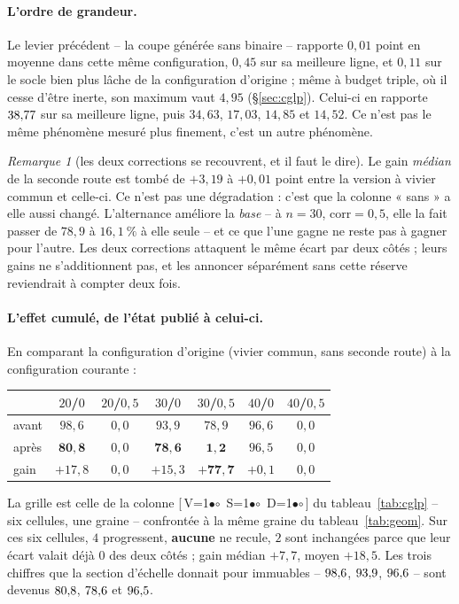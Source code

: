 \documentclass[11pt,a4paper]{article}
\theoremstyle{plain}
\theoremstyle{remark}
\newtheorem{remark}{Remarque}
\newcommand{\cfgm}[1]{\ifnum#1=1$\bullet$\else$\circ$\fi}
\newcommand{\conf}[3]{%
  \textsf{\footnotesize[\,V\cfgm{#1}\ S\cfgm{#2}\ D\cfgm{#3}\,]}}
\begin{document}
\paragraph{L'ordre de grandeur.} Le levier précédent -- la coupe générée
sans binaire -- rapporte $0{,}01$ point en moyenne dans cette même
configuration, $0{,}45$ sur sa meilleure ligne, et $0{,}11$ sur le socle
bien plus lâche de la configuration d'origine ; même à budget triple, où il
cesse d'être inerte, son maximum vaut $4{,}95$ (§\ref{sec:cglp}).
Celui-ci en rapporte $38{,}77{}$ sur sa meilleure ligne, puis $34{,}63$,
$17{,}03$, $14{,}85$ et $14{,}52$. Ce n'est pas le même phénomène mesuré
plus finement, c'est un autre phénomène.

\begin{remark}[les deux corrections se recouvrent, et il faut le dire]
Le gain \emph{médian} de la seconde route est tombé de $+3{,}19$ à
$+0{,}01$ point entre la version à vivier commun et celle-ci. Ce n'est pas
une dégradation : c'est que la colonne « sans » a elle aussi changé.
L'alternance améliore la \emph{base} -- à $n=30$, $\text{corr}=0{,}5$, elle
la fait passer de $78{,}9$ à $16{,}1\ \%$ à elle seule -- et ce que l'une
gagne ne reste pas à gagner pour l'autre. Les deux corrections attaquent le
même écart par deux côtés ; leurs gains ne s'additionnent pas, et les
annoncer séparément sans cette réserve reviendrait à compter deux fois.
\end{remark}

\paragraph{L'effet cumulé, de l'état publié à celui-ci.} En comparant la
configuration d'origine (vivier commun, sans seconde route) à la
configuration courante :
%
\begin{center}
\begin{tabular}{lcccccc}
\toprule
& $20$/$0$ & $20$/$0{,}5$ & $30$/$0$ & $30$/$0{,}5$ & $40$/$0$
& $40$/$0{,}5$\\
\midrule
avant & $98{,}6$ & $0{,}0$ & $93{,}9$ & $78{,}9$ & $96{,}6$ & $0{,}0$\\
après & $\mathbf{80{,}8}$ & $0{,}0$ & $\mathbf{78{,}6}$ & $\mathbf{1{,}2}$
 & $96{,}5$ & $0{,}0$\\
gain & $+17{,}8$ & $0{,}0$ & $+15{,}3$ & $\mathbf{+77{,}7}$ & $+0{,}1$
 & $0{,}0$\\
\bottomrule
\end{tabular}
\end{center}
%
\noindent
La grille est celle de la colonne \conf{0}{0}{0} du
tableau~\ref{tab:cglp} -- six cellules, une graine -- confrontée à la même
graine du tableau~\ref{tab:geom}. Sur ces six cellules, $4$ progressent,
\textbf{aucune} ne recule, $2$ sont inchangées parce que leur écart valait
déjà $0$ des deux côtés ; gain médian $+7{,}7$, moyen $+18{,}5$. Les trois
chiffres que la section d'échelle donnait pour immuables -- $98{,}6{}$,
$93{,}9{}$, $96{,}6{}$ -- sont devenus $80{,}8{}$, $78{,}6{}$ et $96{,}5{}$.
\end{document}

